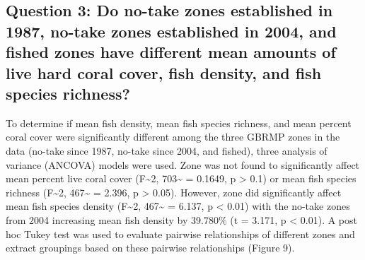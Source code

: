 \documentclass[12pt,]{article}
\begin{document}
\hypertarget{question-3-do-no-take-zones-established-in-1987-no-take-zones-established-in-2004-and-fished-zones-have-different-mean-amounts-of-live-hard-coral-cover-fish-density-and-fish-species-richness}{%
\subsection{Question 3: Do no-take zones established in 1987, no-take
zones established in 2004, and fished zones have different mean amounts
of live hard coral cover, fish density, and fish species
richness?}\label{question-3-do-no-take-zones-established-in-1987-no-take-zones-established-in-2004-and-fished-zones-have-different-mean-amounts-of-live-hard-coral-cover-fish-density-and-fish-species-richness}}

To determine if mean fish density, mean fish species richness, and mean
percent coral cover were significantly different among the three GBRMP
zones in the data (no-take since 1987, no-take since 2004, and fished),
three analysis of variance (ANCOVA) models were used. Zone was not found
to significantly affect mean percent live coral cover
(F\textasciitilde{}2, 703\textasciitilde{} = 0.1649, p \textgreater{}
0.1) or mean fish species richness (F\textasciitilde{}2,
467\textasciitilde{} = 2.396, p \textgreater{} 0.05). However, zone did
significantly affect mean fish species density (F\textasciitilde{}2,
467\textasciitilde{} = 6.137, p \textless{} 0.01) with the no-take zones
from 2004 increasing mean fish density by 39.780\% (t = 3.171, p
\textless{} 0.01). A post hoc Tukey test was used to evaluate pairwise
relationships of different zones and extract groupings based on these
pairwise relationships (Figure 9).
\end{document}
